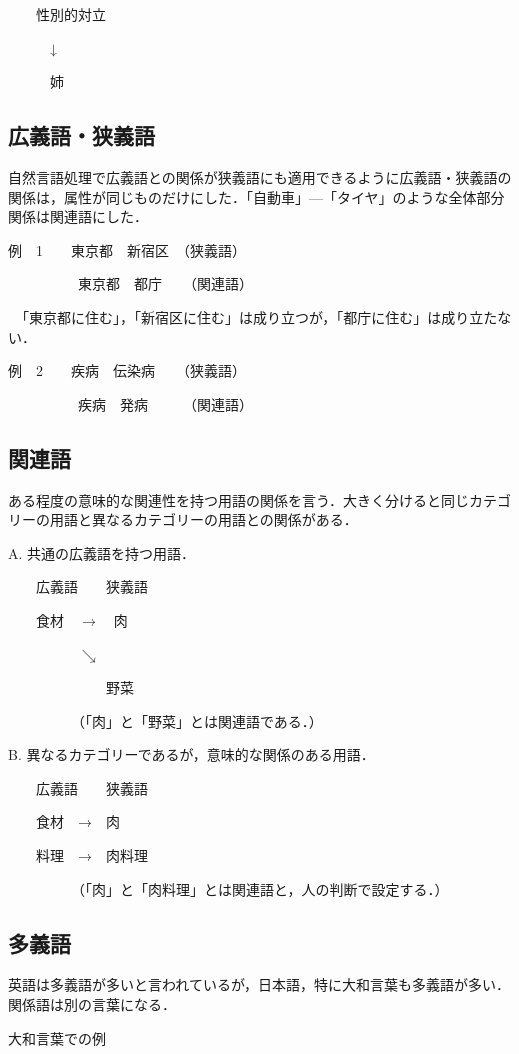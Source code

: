 \documentclass[japanese]{jnlp_1.4}
\begin{document}
　　性別的対立

　　　↓

　　　姉


\subsection{広義語・狭義語}

自然言語処理で広義語との関係が狭義語にも適用できるように広義語・狭義語の関係は，属性が同じものだけにした．「自動車」—「タイヤ」のような全体部分関係は関連語にした．

例　1　　東京都　新宿区　（狭義語）

　　　　　東京都　都庁　　（関連語）

　「東京都に住む」，「新宿区に住む」は成り立つが，「都庁に住む」は成り立たない． 

例　2　　疾病　伝染病　　（狭義語）

　　　　　疾病　発病　　　（関連語）


\subsection{関連語}

ある程度の意味的な関連性を持つ用語の関係を言う．大きく分けると同じカテゴリーの用語と異なるカテゴリーの用語との関係がある．

A. 共通の広義語を持つ用語．

　　広義語　　狭義語

　　食材　$\rightarrow$　肉　　　　

　　　　　$\searrow$

　　　　　　　野菜

　　　　　（「肉」と「野菜」とは関連語である．）

B. 異なるカテゴリーであるが，意味的な関係のある用語． 

　　広義語　　狭義語

　　食材　→　肉

　　料理　→　肉料理 

　　　　　（「肉」と「肉料理」とは関連語と，人の判断で設定する．）


\subsection{多義語}

英語は多義語が多いと言われているが，日本語，特に大和言葉も多義語が多い．関係語は別の言葉になる．

大和言葉での例
\end{document}
